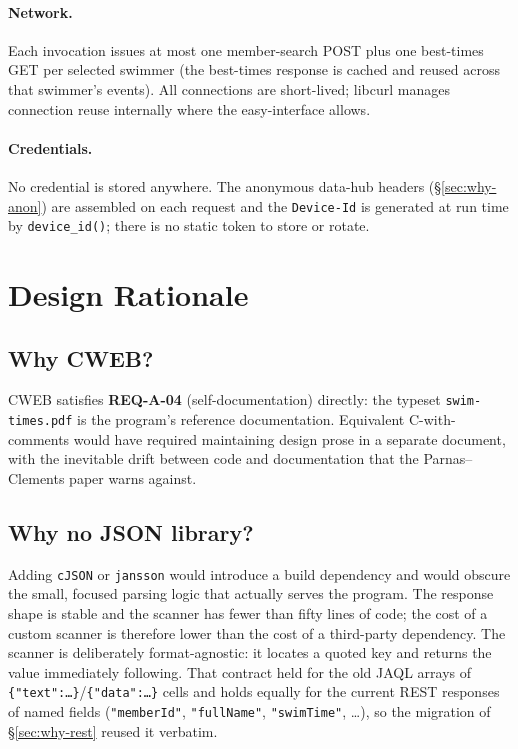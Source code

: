 \documentclass[12pt]{article}
\newcommand{\code}[1]{\texttt{#1}}
\newcommand{\req}[1]{\textbf{#1}}
\begin{document}
\begin{description}[style=nextline]
\paragraph{Network.}
Each invocation issues at most one member-search POST plus one
best-times GET per selected swimmer (the best-times response is
cached and reused across that swimmer's events).  All connections are
short-lived; libcurl manages connection reuse internally where the
easy-interface allows.

\paragraph{Credentials.}
No credential is stored anywhere.  The anonymous data-hub headers
(\S\ref{sec:why-anon}) are assembled on each request and the
\code{Device-Id} is generated at run time by \code{device\_id()};
there is no static token to store or rotate.

\section{Design Rationale}

\subsection{Why CWEB?}

CWEB satisfies \req{REQ-A-04} (self-documentation) directly: the
typeset \code{swim-times.pdf} is the program's reference
documentation.  Equivalent C-with-comments would have required
maintaining design prose in a separate document, with the
inevitable drift between code and documentation that the
Parnas--Clements paper warns against.

\subsection{Why no JSON library?}

Adding \code{cJSON} or \code{jansson} would introduce a build
dependency and would obscure the small, focused parsing logic
that actually serves the program.  The response shape is
stable and the scanner has fewer than fifty lines of code; the
cost of a custom scanner is therefore lower than the cost of a
third-party dependency.  The scanner is deliberately format-agnostic:
it locates a quoted key and returns the value immediately following.
That contract held for the old JAQL arrays of
\code{\{"text":\dots\}}/\code{\{"data":\dots\}} cells and holds equally
for the current REST responses of named fields
(\code{"memberId"}, \code{"fullName"}, \code{"swimTime"}, \dots),
so the migration of \S\ref{sec:why-rest} reused it verbatim.


\end{description}
\end{document}
